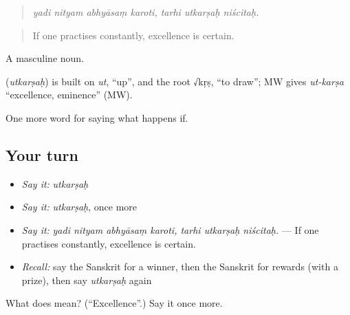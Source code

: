 \begin{quote}
\emph{yadi nityam abhyāsaṃ karoti, tarhi utkarṣaḥ niścitaḥ.}
\end{quote}

\begin{quote}
If one practises constantly, excellence is certain.
\end{quote}

A masculine noun.

\begin{cousinweb}
\textbf{} (\emph{utkarṣaḥ}) is built on \emph{ut}, \textquotedblleft{}up\textquotedblright{}, and the root √kṛṣ, \textquotedblleft{}to draw\textquotedblright{}; MW gives \emph{ut-karṣa} \textquotedblleft{}excellence, eminence\textquotedblright{} (MW).
\end{cousinweb}

\begin{grammarlens}[title={What you've built}]
One more word for saying what happens if.
\end{grammarlens}

\subsection*{Your turn}
\begin{itemize}
\raggedright
  \item \emph{Say it:} \emph{utkarṣaḥ}
  \item \emph{Say it:} \emph{utkarṣaḥ}, once more
  \item \emph{Say it:} \emph{yadi nityam abhyāsaṃ karoti, tarhi utkarṣaḥ niścitaḥ.} — If one practises constantly, excellence is certain.
  \item \emph{Recall:} say the Sanskrit for a winner, then the Sanskrit for rewards (with a prize), then say \emph{utkarṣaḥ} again
\end{itemize}

\begin{tcolorbox}[breakable,colback=teal!4,colframe=teal!35!black,title={Before you move on}]
What does  mean? (\textquotedblleft{}Excellence\textquotedblright{}.) Say it once more.
\end{tcolorbox}
